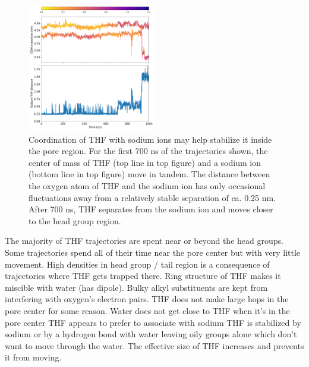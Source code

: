 \documentclass{article}
\begin{document}
  \begin{figure}
  \centering
  \includegraphics[width=0.5\textwidth]{thf_sodium_coordination.pdf}
  \caption{Coordination of THF with sodium ions may help stabilize it inside the
  pore region. For the first 700 ns of the trajectories shown, the center of mass
  of THF (top line in top figure) and a sodium ion (bottom line in top figure) move
  in tandem. The distance between the oxygen atom of THF and the sodium ion has only
  occasional fluctuations away from a relatively stable separation of ca. 0.25 nm. 
  After 700 ns, THF separates from the sodium ion and moves closer to the head group
  region.}\label{fig:thf_sodium_coordination}
  \end{figure}
  
  
  The majority of THF trajectories are spent near or beyond the head groups. Some
  trajectories spend all of their time near the pore center but with very little movement. 
  High densities in head group / tail region is a consequence of trajectories where THF
  gets trapped there. Ring structure of THF makes it miscible with water (has dipole). Bulky alkyl
  substituents are kept from interfering with oxygen's electron pairs. THF does not
  make large hops in the pore center for some reason.
  Water does not get close to THF when it's in the pore center
  THF appears to prefer to associate with sodium 
  THF is stabilized by sodium or by a hydrogen bond with water leaving oily groups alone which
  don't want to move through the water. The effective size of THF increases and prevents it
  from moving.
  
\end{document}
